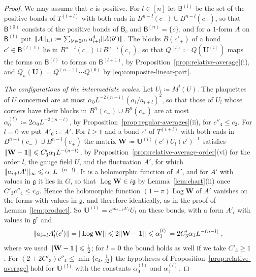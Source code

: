 \documentclass[11pt]{preprint}
\newcommand{\id}{\mathbf 1}
\DeclarePairedDelimiter{\norm}{\lVert}{\rVert}
\numberwithin{equation}{section}
\begin{document}
\begin{proof}
We may assume that $c$ is positive. For $l \in [n]$ let $\mathsf B^{(l)}$ be the set of the positive bonds of $T^{(i+l)}$ with both ends in $B^{n-l}(c_-) \cup B^{n-l}(c_+)$, so that $\mathsf B^{(0)}$ consists of the positive bonds of $\mathsf B_c$ and $\mathsf B^{(n)} = \{ c \}$, and for a $1$-form $A$ on $\mathsf B^{(l)}$ put $\norm A_{1,l} \coloneqq \sum_{b' \in \mathsf B^{(l)}}a_{i+l}^4\norm{A(b')}$. The blocks $B(c'_\pm)$ of a bond $c' \in \mathsf B^{(l+1)}$ lie in $B^{n-l}(c_-) \cup B^{n-l}(c_+)$, so that $Q^{(l)} \coloneqq Q(\mathbf U^{(l)})$ maps the forms on $\mathsf B^{(l)}$ to forms on $\mathsf B^{(l+1)}$, by Proposition~\ref{prop:relative-average}(i), and $Q_n(\mathbf U) = Q^{(n-1)}\cdots Q^{(0)}$ by \eqref{eq:composite-linear-part}.

\emph{The configurations of the intermediate scales.} Let $U_l \coloneqq M^l(U)$. The plaquettes of $U$ concerned are at most $\alpha_0L^{-2(n-l)}(a_i/a_{i+l})^2$, so that those of $U_l$ whose corners have their blocks in $B^n(c_-) \cup B^n(c_+)$ are at most $\alpha_0^{(l)} \coloneqq 2\alpha_0L^{-2(n-l)}$, by Proposition~\ref{prop:regular-averages}(ii), for $c''_4 \leqslant c_2$. For $l = 0$ we put $A'_0 \coloneqq A'$. For $l \geqslant 1$ and a bond $c'$ of $T^{(i+l)}$ with both ends in $B^{n-l}(c_-) \cup B^{n-l}(c_+)$ the matrix $\mathbf W \coloneqq \mathbf U^{(l)}(c')U_l(c')^{-1}$ satisfies $\norm{\mathbf W - \id} \leqslant C'_3\alpha_1L^{-(n-l)}$, by Proposition~\ref{prop:relative-average-order}(vi) for the order $l$, the gauge field $U$, and the fluctuation $A'$, for which $\norm{a_{i+l}A'}_\infty \leqslant \alpha_1L^{-(n-l)}$. It is a holomorphic function of $A'$, and for $A'$ with values in $\mathfrak g$ it lies in $G$, so that $\operatorname{Log}\mathbf W \in i\mathfrak g$ by Lemma~\ref{lem:chart}(ii) once $C'_3c''_4 \leqslant r_G$. Hence the holomorphic function $(1 - \pi)\operatorname{Log}\mathbf W$ of $A'$ vanishes on the forms with values in $\mathfrak g$, and therefore identically, as in the proof of Lemma~\ref{lem:product}. So $\mathbf U^{(l)} = e^{ia_{i+l}A'_l}U_l$ on these bonds, with a form $A'_l$ with values in $\mathfrak g^c$ and
\[
    \norm{a_{i+l}A'_l(c')} = \norm{\operatorname{Log}\mathbf W} \leqslant 2\norm{\mathbf W - \id} \leqslant \alpha_1^{(l)} \coloneqq 2C'_3\alpha_1L^{-(n-l)}\;,
\]
where we used $\norm{\mathbf W - \id} \leqslant \frac{1}{2}$; for $l = 0$ the bound holds as well if we take $C'_3 \geqslant 1$. For $(2 + 2C'_3)c''_4 \leqslant \min\{ c_4, \frac{1}{32} \}$ the hypotheses of Proposition~\ref{prop:relative-average} hold for $\mathbf U^{(l)}$ with the constants $\alpha_0^{(l)}$ and $\alpha_1^{(l)}$.


\end{proof}
\end{document}
